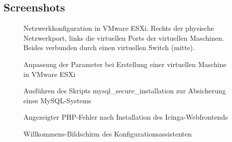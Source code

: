 \subsection{Screenshots}
\label{Screenshots}

\begin{figure}[htb]
\centering
{}
\caption{Netzwerkkonfiguration in VMware ESXi. Rechts der physische Netzwerkport, links die virtuellen Ports der virtuellen Maschinen. Beides verbunden durch einen virtuellen Switch (mitte).}
\label{screen:vmnetwork}
\end{figure}

\begin{figure}[htb]
\centering
{}
\caption{Anpassung der Parameter bei Erstellung einer virtuellen Maschine in VMware ESXi}
\label{screen:vmcreation}
\end{figure}
\clearpage

\begin{figure}[!htb]
\centering
{}
\caption{Ausführen des Skripts \glqq{}mysql\_{}secure\_{}installation\grqq{} zur Absicherung eines MySQL-Systems}
\label{screen:mysqlsecure}
\end{figure}

\begin{figure}[!htb]
\centering
{}
\caption{Angezeigter PHP-Fehler nach Installation des Icinga-Webfrontends}
\label{screen:phperror}
\end{figure}

\begin{figure}[!htb]
\centering
{}
\caption{Willkommens-Bildschirm des Konfigurationsassistenten}
\label{screen:konfigassistent}
\end{figure}
